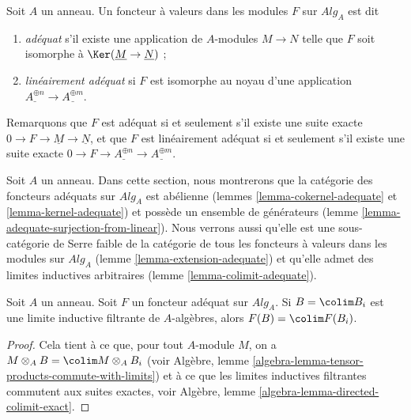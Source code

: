 \begin{definition}
\label{definition-adequate-functor}
Soit $A$ un anneau. Un foncteur à valeurs dans les modules $F$ sur
$\textit{Alg}_A$ est dit
\begin{enumerate}
\item {\it adéquat} s'il existe une
application de $A$-modules $M \to N$ telle que $F$ soit isomorphe à
$\Ker(\underline{M} \to \underline{N})$ ;
\item {\it linéairement adéquat} si $F$ est isomorphe au
noyau d'une application $\underline{A^{\oplus n}} \to \underline{A^{\oplus m}}$.
\end{enumerate}
\end{definition}

\noindent
Remarquons que $F$ est adéquat si et seulement s'il existe une
suite exacte $0 \to F \to \underline{M} \to \underline{N}$, et que
$F$ est linéairement adéquat si et seulement s'il existe une suite exacte
$0 \to F \to \underline{A^{\oplus n}} \to \underline{A^{\oplus m}}$.

\medskip\noindent
Soit $A$ un anneau. Dans cette section, nous montrerons que la catégorie
des foncteurs adéquats sur $\textit{Alg}_A$ est abélienne
(lemmes \ref{lemma-cokernel-adequate} et \ref{lemma-kernel-adequate})
et possède un ensemble de générateurs
(lemme \ref{lemma-adequate-surjection-from-linear}).
Nous verrons aussi qu'elle est une sous-catégorie de Serre faible de la catégorie
de tous les foncteurs à valeurs dans les modules sur $\textit{Alg}_A$
(lemme \ref{lemma-extension-adequate})
et qu'elle admet des limites inductives arbitraires
(lemme \ref{lemma-colimit-adequate}).

\begin{lemma}
\label{lemma-adequate-finite-presentation}
Soit $A$ un anneau.
Soit $F$ un foncteur adéquat sur $\textit{Alg}_A$.
Si $B = \colim B_i$ est une limite inductive filtrante de
$A$-algèbres, alors $F(B) = \colim F(B_i)$.
\end{lemma}

\begin{proof}
Cela tient à ce que, pour tout $A$-module $M$, on a
$M \otimes_A B = \colim M \otimes_A B_i$ (voir
Algèbre, lemme \ref{algebra-lemma-tensor-products-commute-with-limits})
et à ce que les limites inductives filtrantes commutent aux suites exactes, voir
Algèbre, lemme \ref{algebra-lemma-directed-colimit-exact}.
\end{proof}

